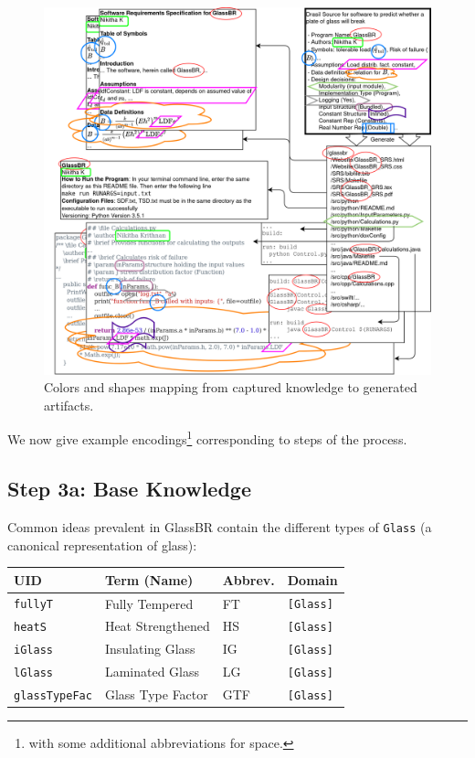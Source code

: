 \documentclass[sigconf,review,anonymous=false]{acmart}
\begin{document}
\begin{figure}[h]
  \centering
  \includegraphics[width=\linewidth]{assets/DrasilSupportsChange-right-portrait-overlapped-ungrouped-11ptFont-squished-noSmith-v1-300dpi.png}
  \caption{Colors and shapes mapping from captured knowledge to generated
  artifacts.}
  \label{Fig_DrasilAndChange}
\end{figure}

We now give example encodings\footnote{with some additional abbreviations 
for space.}
corresponding to steps of the process.
\subsection*{Step 3a: Base Knowledge}

Common ideas prevalent in GlassBR contain the different types 
of \texttt{Glass} (a canonical representation of glass):
\begin{center}
  \begin{tabular}{|l|l|l|l|}
    \hline
    \textbf{UID} & \textbf{Term (Name)} & \textbf{Abbrev.} & \textbf{Domain} \\ \hline
    \texttt{fullyT} & Fully Tempered & FT & \texttt{[Glass]} \\ \hline
    \texttt{heatS} & Heat Strengthened & HS & \texttt{[Glass]} \\ \hline
    \texttt{iGlass} & Insulating Glass & IG & \texttt{[Glass]} \\ \hline
    \texttt{lGlass} & Laminated Glass & LG & \texttt{[Glass]} \\ \hline
    \texttt{glassTypeFac} & Glass Type Factor & GTF & \texttt{[Glass]} \\ \hline
  \end{tabular}
\end{center}
\end{document}
